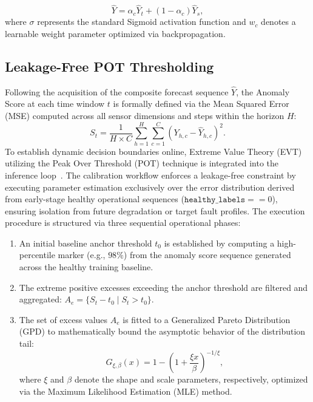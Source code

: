 \documentclass[cmes,article,submit,moreauthors,pdftex]{Definitions/tsp}
\begin{document}
\begin{equation}
\widehat{Y} = \alpha_{c} \widehat{Y}_{t} + (1 - \alpha_{c}) \widehat{Y}_{s},
\tag{21}
\end{equation}
where $\sigma$ represents the standard Sigmoid activation function and $w_{c}$ denotes a learnable weight parameter optimized via backpropagation.

\subsection{Leakage-Free POT Thresholding} \label{sect:s3dot5}
Following the acquisition of the composite forecast sequence $\widehat{Y}$, the Anomaly Score at each time window $t$ is formally defined via the Mean Squared Error (MSE) computed across all sensor dimensions and steps within the horizon $H$:
\begin{equation}
\label{eq:anomaly_score}
S_{t} = \frac{1}{H \times C} \sum_{h = 1}^{H} \sum_{c = 1}^{C} \left(Y_{h, c} - \widehat{Y}_{h, c}\right)^{2}.
\tag{22}
\end{equation}
To establish dynamic decision boundaries online, Extreme Value Theory (EVT) utilizing the Peak Over Threshold (POT) technique is integrated into the inference loop~\cite{ref-10}. The calibration workflow enforces a leakage-free constraint by executing parameter estimation exclusively over the error distribution derived from early-stage healthy operational sequences ($\texttt{healthy\_labels} == 0$), ensuring isolation from future degradation or target fault profiles. The execution procedure is structured via three sequential operational phases:
\begin{enumerate}
\item An initial baseline anchor threshold $t_{0}$ is established by computing a high-percentile marker (e.g., $98\%$) from the anomaly score sequence generated across the healthy training baseline.
\item The extreme positive excesses exceeding the anchor threshold are filtered and aggregated: $A_{e} = \{ S_{t} - t_{0} \mid S_{t} > t_{0} \}$.
\item The set of excess values $A_{e}$ is fitted to a Generalized Pareto Distribution (GPD) to mathematically bound the asymptotic behavior of the distribution tail:
\begin{equation}
G_{\xi , \beta} (x) = 1 - \left(1 + \frac {\xi x}{\beta}\right) ^ {- 1 / \xi},
\tag{23}
\end{equation}
where $\xi$ and $\beta$ denote the shape and scale parameters, respectively, optimized via the Maximum Likelihood Estimation (MLE) method.
\end{enumerate}
\end{document}

